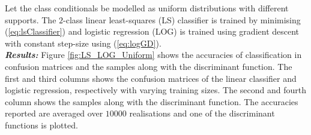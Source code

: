 \documentclass[12pt, a4 paper]{article}
\begin{document}

\label{prob:1.b}

Let the class conditionals be modelled as uniform distributions with different supports. The $2$-class linear least-squares (LS) classifier is trained by minimising (\ref{eq:lsClassifier}) and logistic regression (LOG) is trained using gradient descent with constant step-size using (\ref{eq:logGD}). \\

{\it \bfseries Results:} Figure \ref{fig:LS_LOG_Uniform} shows the accuracies of classification in confusion matrices and the samples along with the discriminant function. The first and third columns shows the confusion matrices of the linear classifier and logistic regression, respectively with varying training sizes. The second and fourth column shows the samples along with the discriminant function. The accuracies reported are averaged over $10000$ realisations and one of the discriminant functions is plotted. \\
\end{document}
